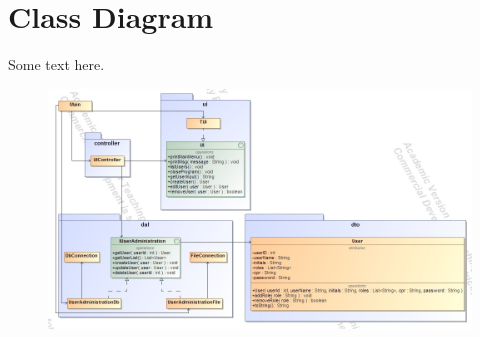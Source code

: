 \section{Class Diagram}
Some text here.
\begin{figure}[h]
    \centering
    \vspace{-3cm}
    \includegraphics[width=24cm,angle=90]{implementation/KlasseDiagram.jpg}
\end{figure}